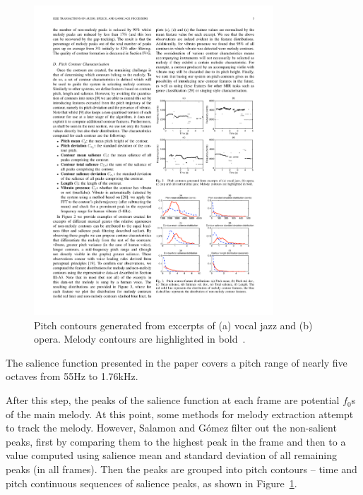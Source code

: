 \begin{figure}[t]
  \centering
    \includegraphics[width=0.8\textwidth]{Figures/pitchcontour}
      \caption{Pitch contours generated from excerpts of (a) vocal jazz and (b) opera. Melody contours are highlighted in bold~\cite{salamon}.}
\label{fig:pitchcontours}
\end{figure}

The salience function presented in the paper covers a pitch range of nearly five octaves from 55Hz to 1.76kHz.

After this step, the peaks of the salience function at each frame are potential $f_{0}$s of the main melody. At this point, some methods for melody extraction attempt to track the melody. However, Salamon and G\'{o}mez filter out the non-salient peaks, first by comparing them to the highest peak in the frame and then to a value computed using salience mean and standard deviation of all remaining peaks (in all frames). Then the peaks are grouped into pitch contours -- time and pitch continuous sequences of salience peaks, as shown in Figure~\ref{fig:pitchcontours}.

